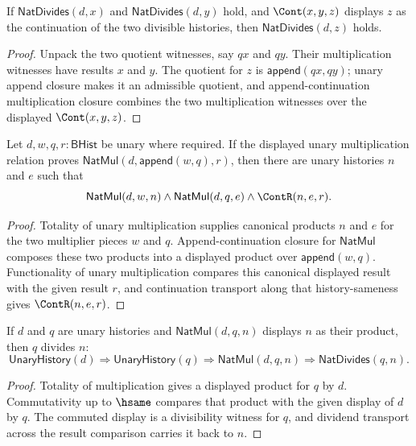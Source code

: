 \begin{lemma}
\label{thm:nat-divides-cont-closed}
If $\mathsf{NatDivides}(d,x)$ and $\mathsf{NatDivides}(d,y)$ hold, and
$\Cont(x,y,z)$ displays $z$ as the continuation of the two divisible histories,
then $\mathsf{NatDivides}(d,z)$ holds.
\end{lemma}
\begin{proof}
Unpack the two quotient witnesses, say $qx$ and $qy$. Their multiplication
witnesses have results $x$ and $y$. The quotient for $z$ is
$\mathsf{append}(qx,qy)$; unary append closure makes it an admissible quotient,
and append-continuation multiplication closure combines the two multiplication
witnesses over the displayed $\Cont(x,y,z)$.
\end{proof}

\begin{lemma}
\label{lem:natmul-append-multiplier-split-exists}
Let \(d,w,q,r:\mathsf{BHist}\) be unary where required. If the displayed unary
multiplication relation proves
\(\mathsf{NatMul}(d,\mathsf{append}(w,q),r)\), then there are unary histories
\(n\) and \(e\) such that
$$
\mathsf{NatMul}(d,w,n)\land
\mathsf{NatMul}(d,q,e)\land
\ContR(n,e,r).
$$
\end{lemma}
\begin{proof}
Totality of unary multiplication supplies canonical products \(n\) and \(e\)
for the two multiplier pieces \(w\) and \(q\). Append-continuation closure for
\(\mathsf{NatMul}\) composes these two products into a displayed product over
\(\mathsf{append}(w,q)\). Functionality of unary multiplication compares this
canonical displayed result with the given result \(r\), and continuation
transport along that history-sameness gives \(\ContR(n,e,r)\).
\end{proof}

\begin{lemma}
\label{thm:nat-divides-mul-right-closed}
If $d$ and $q$ are unary histories and $\mathsf{NatMul}(d,q,n)$ displays
$n$ as their product, then $q$ divides $n$:
$$
\mathsf{UnaryHistory}(d)\Longrightarrow
\mathsf{UnaryHistory}(q)\Longrightarrow
\mathsf{NatMul}(d,q,n)\Longrightarrow
\mathsf{NatDivides}(q,n).
$$
\end{lemma}
\begin{proof}
Totality of multiplication gives a displayed product for $q$ by $d$.
Commutativity up to $\hsame$ compares that product with the given display
of $d$ by $q$. The commuted display is a divisibility witness for $q$, and
dividend transport across the result comparison carries it back to $n$.
\end{proof}

